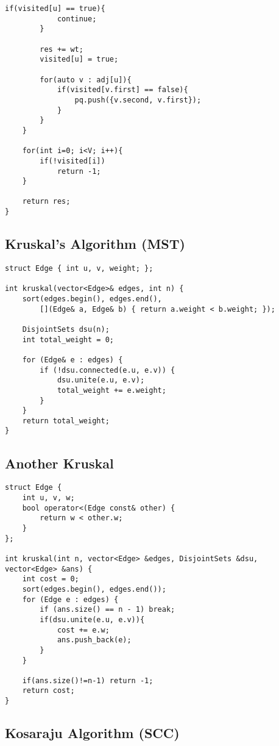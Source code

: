 \documentclass[10pt]{article}
\begin{document}
\begin{multicols*}{2}
\begin{lstlisting}[style=compactcpp]
        if(visited[u] == true){
            continue; 
        }
        
        res += wt;
        visited[u] = true;
        
        for(auto v : adj[u]){
            if(visited[v.first] == false){
                pq.push({v.second, v.first});
            }
        }
    }

    for(int i=0; i<V; i++){
        if(!visited[i])
            return -1;
    }
    
    return res;
}
\end{lstlisting}

\subsection{Kruskal's Algorithm (MST)}

\begin{lstlisting}[style=compactcpp]
struct Edge { int u, v, weight; };

int kruskal(vector<Edge>& edges, int n) {
    sort(edges.begin(), edges.end(), 
        [](Edge& a, Edge& b) { return a.weight < b.weight; });
    
    DisjointSets dsu(n);
    int total_weight = 0;
    
    for (Edge& e : edges) {
        if (!dsu.connected(e.u, e.v)) {
            dsu.unite(e.u, e.v);
            total_weight += e.weight;
        }
    }
    return total_weight;
}
\end{lstlisting}

\subsection{Another Kruskal}

\begin{lstlisting}[style=compactcpp]
struct Edge {
    int u, v, w;
    bool operator<(Edge const& other) {
        return w < other.w;
    }
};
 
int kruskal(int n, vector<Edge> &edges, DisjointSets &dsu, vector<Edge> &ans) {
    int cost = 0;
    sort(edges.begin(), edges.end());
    for (Edge e : edges) {
        if (ans.size() == n - 1) break;
        if(dsu.unite(e.u, e.v)){
            cost += e.w;
            ans.push_back(e);
        }
    }
 
    if(ans.size()!=n-1) return -1;
    return cost;
}
\end{lstlisting}

\subsection{Kosaraju Algorithm (SCC)}


\end{multicols*}
\end{document}
